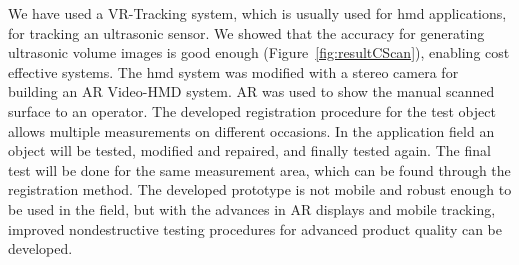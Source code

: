 \documentclass{VRARWorkshop}
\begin{document}
We have used a VR-Tracking system, which is usually used for {\sc hmd} applications, for tracking an ultrasonic sensor.
We showed that the accuracy for generating ultrasonic volume images is good enough (Figure~\ref{fig:resultCScan}), enabling cost effective systems.
The {\sc hmd} system was modified with a stereo camera for building an AR {\sc Video-HMD} system.
AR was used to show the manual scanned surface to an operator.
The developed registration procedure for the test object allows multiple measurements on different occasions.
In the application field an object will be tested, modified and repaired, and finally tested again.
The final test will be done for the same measurement area, which can be found through the registration method.
The developed prototype is not mobile and robust enough to be used in the field, but with the advances in AR displays and mobile tracking, improved nondestructive testing procedures for advanced product quality can be developed.

\VRARsetbibstyle

\end{document}
